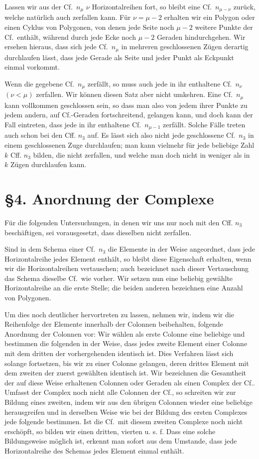 \documentclass[11pt]{article}
\newcommand{\Cf}{\textup{Cf.}}
\begin{document}
Lassen wir aus der \Cf\ $n_\mu$ $\nu$ Horizontalreihen fort, so bleibt eine \Cf\ $n_{\mu-\nu}$ zurück, welche natürlich auch zerfallen kann. Für $\nu=\mu-2$ erhalten wir ein Polygon oder einen Cyklus von Polygonen, von denen jede Seite noch $\mu-2$ weitere Punkte der \Cf\ enthält, während durch jede Ecke noch $\mu-2$ Geraden hindurchgehen. Wir ersehen hieraus, dass sich jede \Cf\ $n_\mu$ in mehreren geschlossenen Zügen derartig durchlaufen lässt, dass jede Gerade als Seite und jeder Punkt als Eckpunkt einmal vorkommt.

Wenn die gegebene \Cf\ $n_\mu$ zerfällt, so muss auch jede in ihr enthaltene \Cf\ $n_\nu$ $(\nu<\mu)$ zerfallen. Wir können diesen Satz aber nicht umkehren. Eine \Cf\ $n_\mu$ kann vollkommen geschlossen sein, so dass man also von jedem ihrer Punkte zu jedem andern, auf \Cf-Geraden fortschreitend, gelangen kann, und doch kann der Fall eintreten, dass jede in ihr enthaltene \Cf\ $n_{\mu-1}$ zerfällt. Solche Fälle treten auch schon bei den Cff. $n_3$ auf. Es lässt sich also nicht jede geschlossene \Cf\ $n_3$ in einem geschlossenen Zuge durchlaufen; man kann vielmehr für jede beliebige Zahl $k$ Cff. $n_3$ bilden, die nicht zerfallen, und welche man doch nicht in weniger als in $k$ Zügen durchlaufen kann.

\section*{\S 4. Anordnung der Complexe}
Für die folgenden Untersuchungen, in denen wir uns nur noch mit den Cff. $n_3$ beschäftigen, sei vorausgesetzt, dass dieselben nicht zerfallen.

Sind in dem Schema einer \Cf\ $n_3$ die Elemente in der Weise angeordnet, dass jede Horizontalreihe jedes Element enthält, so bleibt diese Eigenschaft erhalten, wenn wir die Horizontalreihen vertauschen; auch bezeichnet nach dieser Vertauschung das Schema dieselbe \Cf\ wie vorher. Wir setzen nun eine beliebig gewählte Horizontalreihe an die erste Stelle; die beiden anderen bezeichnen eine Anzahl von Polygonen.

Um dies noch deutlicher hervortreten zu lassen, nehmen wir, indem wir die Reihenfolge der Elemente innerhalb der Colonnen beibehalten, folgende Anordnung der Colonnen vor: Wir wählen als erste Colonne eine beliebige und bestimmen die folgenden in der Weise, dass jedes zweite Element einer Colonne mit dem dritten der vorhergehenden identisch ist. Dies Verfahren lässt sich solange fortsetzen, bis wir zu einer Colonne gelangen, deren drittes Element mit dem zweiten der zuerst gewählten identisch ist. Wir bezeichnen die Gesamtheit der auf diese Weise erhaltenen Colonnen oder Geraden als einen Complex der \Cf. Umfasst der Complex noch nicht alle Colonnen der \Cf, so schreiten wir zur Bildung eines zweiten, indem wir aus den übrigen Colonnen wieder eine beliebige herausgreifen und in derselben Weise wie bei der Bildung des ersten Complexes jede folgende bestimmen. Ist die \Cf\ mit diesem zweiten Complexe noch nicht erschöpft, so bilden wir einen dritten, vierten u. s. f. Dass eine solche Bildungsweise möglich ist, erkennt man sofort aus dem Umstande, dass jede Horizontalreihe des Schemas jedes Element einmal enthält.
\end{document}
